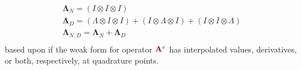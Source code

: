 \begin{definition}
\begin{equation}
\begin{array}{c}
\mathbf{\Lambda}_N      = \left( I \otimes I \otimes I \right)  \\
\mathbf{\Lambda}_D      = \left( \Lambda \otimes I \otimes I\right) + \left( I \otimes \Lambda \otimes I\right) + \left( I \otimes I \otimes \Lambda \right)  \\
\mathbf{\Lambda}_{N, D} = \mathbf{\Lambda}_N + \mathbf{\Lambda}_D  \\
\end{array}
\end{equation}
based upon if the weak form for operator ${\color{burgundy}\mathbf{A}}^e$ has interpolated values, derivatives, or both, respectively, at quadrature points.
\end{definition}

